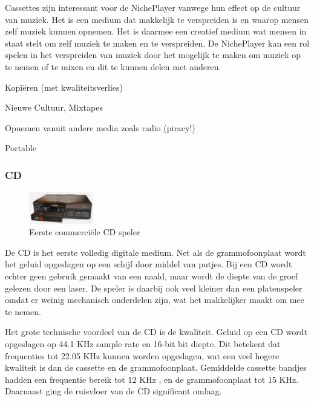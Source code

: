 Cassettes zijn interessant voor de NichePlayer vanwege hun effect op de cultuur van muziek. Het is een medium dat makkelijk te verspreiden is en waarop mensen zelf muziek kunnen opnemen. Het is daarmee een creatief medium wat mensen in staat stelt om zelf muziek te maken en te verspreiden. De NichePlayer kan een rol spelen in het verspreiden van muziek door het mogelijk te maken om muziek op te nemen of te mixen en dit te kunnen delen met anderen.

\begin{todolist}
    \item Kopiëren (met kwaliteitsverlies)
    \item[\done] Nieuwe Cultuur, Mixtapes
    \item[\done] Opnemen vanuit andere media zoals radio (piracy!)
    \item[\done] Portable
\end{todolist}

\subsubsection*{CD}
\begin{figure}
    \centering
    \includegraphics[width=0.25\textwidth]{assets/critical-review/CD-Player.jpeg}
    \caption{Eerste commerciële CD speler}
    \label{fig:critical-review:cp-player}
\end{figure}
De CD is het eerste volledig digitale medium. Net als de grammofoonplaat wordt het geluid opgeslagen op een schijf door middel van putjes. Bij een CD wordt echter geen gebruik gemaakt van een naald, maar wordt de diepte van de groef gelezen door een laser. De speler is daarbij ook veel kleiner dan een platenspeler omdat er weinig mechanisch onderdelen zijn, wat het makkelijker maakt om mee te nemen.

Het grote technische voordeel van de CD is de kwaliteit. Geluid op een CD wordt opgeslagen op 44.1 KHz sample rate en 16-bit bit diepte. Dit betekent dat frequenties tot 22.05 KHz kunnen worden opgeslagen, wat een veel hogere kwaliteit is dan de cassette en de grammofoonplaat. Gemiddelde cassette bandjes hadden een frequentie bereik tot 12 KHz \citep{van1970audio}, en de grammofoonplaat tot 15 KHz. Daarnaast ging de ruisvloer van de CD significant omlaag.

